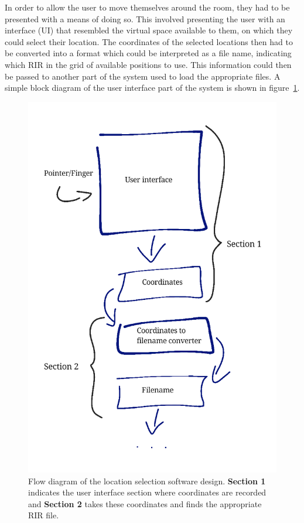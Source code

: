 \documentclass[../../main.tex]{subfiles}
\begin{document}
			In order to allow the user to move themselves around the room, they had to be presented with a means of doing so. This involved presenting the user with an interface (UI) that resembled the virtual space available to them, on which they could select their location. The coordinates of the selected locations then had to be converted into a format which could be interpreted as a file name, indicating which \ac{RIR} in the grid of available positions to use. This information could then be passed to another part of the system used to load the appropriate files. A simple block diagram of the user interface part of the system is shown in figure~\ref{flowDiagram}.


			\begin{figure}[t]
				\centerline{\includegraphics[scale = 0.3]{Sections/Implementation/Max/images/FlowDiagrams/Max1_V2.png}}
				\caption{Flow diagram of the location selection software design. \textbf{Section 1} indicates the user interface section where coordinates are recorded and \textbf{Section 2} takes these coordinates and finds the appropriate \ac{RIR} file.}
				\label{flowDiagram}
			\end{figure}
\end{document}
